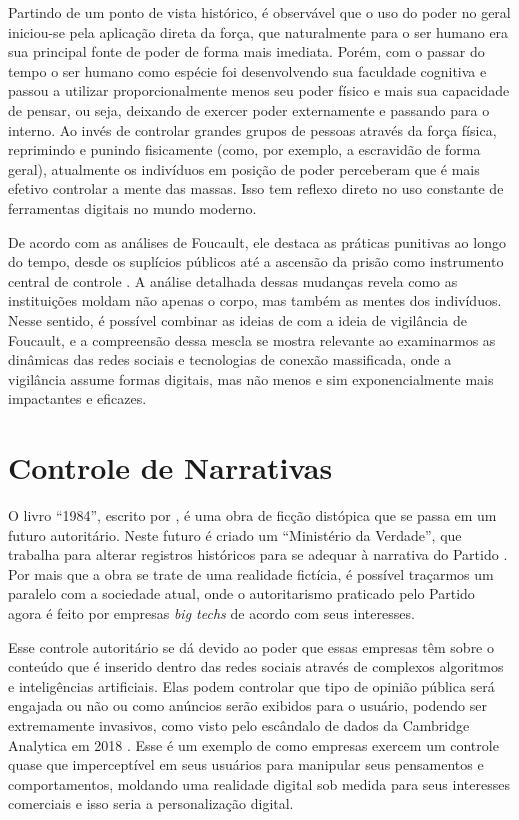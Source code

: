 \documentclass[
	12pt,
	openright,
	twoside,
	a4paper,
	english,
	french,
	spanish,
	brazil
]{abntex2}
\begin{document}
  Partindo de um ponto de vista histórico, é observável que o uso do poder no
  geral iniciou-se pela aplicação direta da força, que naturalmente para o ser
  humano era sua principal fonte de poder de forma mais imediata. Porém, com o
  passar do tempo o ser humano como espécie foi desenvolvendo sua faculdade
  cognitiva e passou a utilizar proporcionalmente menos seu poder físico e mais
  sua capacidade de pensar, ou seja, deixando de exercer poder externamente e
  passando para o interno. Ao invés de controlar grandes grupos de pessoas
  através da força física, reprimindo e punindo fisicamente (como, por exemplo,
  a escravidão de forma geral), atualmente os indivíduos em posição de poder
  perceberam que é mais efetivo controlar a mente das massas. Isso tem reflexo
  direto no uso constante de ferramentas digitais no mundo moderno.

  De acordo com as análises de Foucault, ele destaca as práticas punitivas ao
  longo do tempo, desde os suplícios públicos até a ascensão da prisão como
  instrumento central de controle \cite{foucault-vigiar-punir}. A análise
  detalhada dessas mudanças revela como as instituições moldam não apenas o
  corpo, mas também as mentes dos indivíduos. Nesse sentido, é possível combinar
  as ideias de  com a ideia de
  vigilância de Foucault, e a compreensão dessa mescla se mostra relevante ao
  examinarmos as dinâmicas das redes sociais e tecnologias de conexão
  massificada, onde a vigilância assume formas digitais, mas não menos e sim
  exponencialmente mais impactantes e eficazes.


  \section{Controle de Narrativas}

  O livro ``1984'', escrito por , é uma obra de
  ficção distópica que se passa em um futuro autoritário. Neste futuro é criado
  um ``Ministério da Verdade'', que trabalha para alterar registros históricos
  para se adequar à narrativa do Partido \cite{orwell-1984}. Por mais que a obra
  se trate de uma realidade fictícia, é possível traçarmos um paralelo com a
  sociedade atual, onde o autoritarismo praticado pelo Partido agora é feito por
  empresas \textit{big techs} de acordo com seus interesses.

  Esse controle autoritário se dá devido ao poder que essas empresas têm sobre o
  conteúdo que é inserido dentro das redes sociais através de complexos
  algoritmos e inteligências artificiais. Elas podem controlar que tipo de
  opinião pública será engajada ou não ou como anúncios serão exibidos para o
  usuário, podendo ser extremamente invasivos, como visto pelo escândalo de
  dados da Cambridge Analytica em 2018 \cite{chan-cambridge-analytica}. Esse é
  um exemplo de como empresas exercem um controle quase que imperceptível em
  seus usuários para manipular seus pensamentos e comportamentos, moldando uma
  realidade digital sob medida para seus interesses comerciais e isso seria a
  personalização digital.
\end{document}
